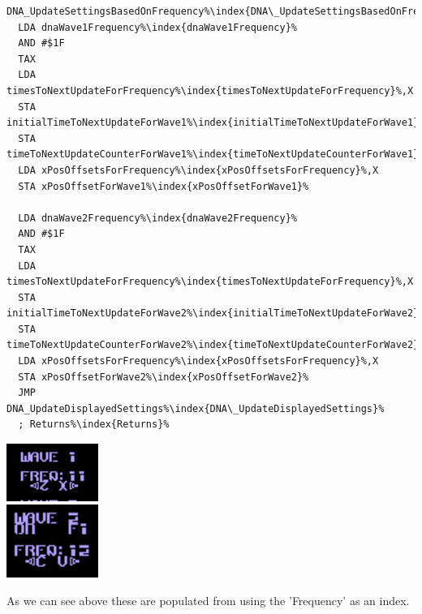\begin{minipage}[b]{0.75\linewidth}
\centering
\begin{lstlisting}[caption=The value selected for 'Frequency' for Wave 1 and 2 translates to settings used in calculating the next X position for each chain.,escapechar=\%]
DNA_UpdateSettingsBasedOnFrequency%\index{DNA\_UpdateSettingsBasedOnFrequency}%
  LDA dnaWave1Frequency%\index{dnaWave1Frequency}%
  AND #$1F
  TAX
  LDA timesToNextUpdateForFrequency%\index{timesToNextUpdateForFrequency}%,X
  STA initialTimeToNextUpdateForWave1%\index{initialTimeToNextUpdateForWave1}%
  STA timeToNextUpdateCounterForWave1%\index{timeToNextUpdateCounterForWave1}%
  LDA xPosOffsetsForFrequency%\index{xPosOffsetsForFrequency}%,X
  STA xPosOffsetForWave1%\index{xPosOffsetForWave1}%

  LDA dnaWave2Frequency%\index{dnaWave2Frequency}%
  AND #$1F
  TAX
  LDA timesToNextUpdateForFrequency%\index{timesToNextUpdateForFrequency}%,X
  STA initialTimeToNextUpdateForWave2%\index{initialTimeToNextUpdateForWave2}%
  STA timeToNextUpdateCounterForWave2%\index{timeToNextUpdateCounterForWave2}%
  LDA xPosOffsetsForFrequency%\index{xPosOffsetsForFrequency}%,X
  STA xPosOffsetForWave2%\index{xPosOffsetForWave2}%
  JMP DNA_UpdateDisplayedSettings%\index{DNA\_UpdateDisplayedSettings}%
  ; Returns%\index{Returns}%
\end{lstlisting}
\end{minipage}
\hspace{0.5cm}
\begin{minipage}[b]{0.25\linewidth}
\centering
      \includegraphics[width=3cm]{dna/dnafreq1.png}\\
      \vspace{1cm}
      \includegraphics[width=3cm]{dna/dnafreq2.png}%
      \vspace{1cm}
\end{minipage}
As we can see above these are populated from  using the 'Frequency' as an index.

